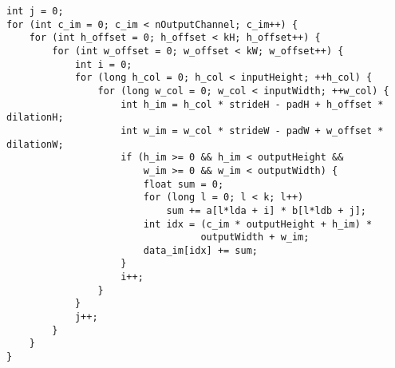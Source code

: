 \begin{code}
\begin{verbatim}
int j = 0;
for (int c_im = 0; c_im < nOutputChannel; c_im++) {
    for (int h_offset = 0; h_offset < kH; h_offset++) {
        for (int w_offset = 0; w_offset < kW; w_offset++) {
            int i = 0;
            for (long h_col = 0; h_col < inputHeight; ++h_col) {
                for (long w_col = 0; w_col < inputWidth; ++w_col) {
                    int h_im = h_col * strideH - padH + h_offset * dilationH;
                    int w_im = w_col * strideW - padW + w_offset * dilationW;
                    if (h_im >= 0 && h_im < outputHeight &&
                        w_im >= 0 && w_im < outputWidth) {
                        float sum = 0;
                        for (long l = 0; l < k; l++)
                            sum += a[l*lda + i] * b[l*ldb + j];
                        int idx = (c_im * outputHeight + h_im) *
                                  outputWidth + w_im;
                        data_im[idx] += sum;
                    }
                    i++;
                }
            }
            j++;
        }
    }
}
\end{verbatim}
\label{code:transposed_convolution}
\end{code}

\clearpage %
